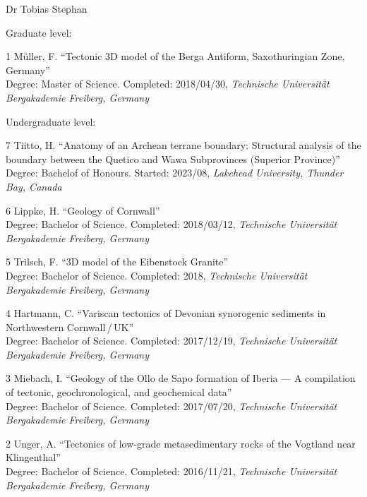 \documentclass[10pt, paper=letter]{scrartcl} %
\begin{document}
\begin{cv}{\textsf{Dr Tobias Stephan}}
\begin{cvlist}{Graduate level:}
        \item[1] Müller, F. \enquote{Tectonic 3D model of the Berga Antiform, Saxothuringian Zone, Germany}\\
        Degree: Master of Science.
        Completed: 2018/04/30, \textit{Technische Universität Bergakademie Freiberg, Germany}
    \end{cvlist}

    \begin{cvlist}{Undergraduate level:}
        \item[7] Tiitto, H. \enquote{Anatomy of an Archean terrane boundary:
            Structural analysis of the boundary between the Quetico and Wawa Subprovinces
            (Superior Province)}\\
        Degree: Bachelof of Honours. Started: 2023/08, \textit{Lakehead University, Thunder
            Bay, Canada}

        \item[6] Lippke, H. \enquote{Geology of Cornwall}\\
        Degree: Bachelor of Science. Completed: 2018/03/12, \textit{Technische Universität Bergakademie Freiberg, Germany}

        \item[5] Trilsch, F. \enquote{3D model of the Eibenstock Granite}\\
        Degree: Bachelor of Science. Completed: 2018, \textit{Technische Universität Bergakademie Freiberg, Germany}

        \item[4] Hartmann, C. \enquote{Variscan tectonics of Devonian synorogenic sediments in Northwestern Cornwall\,/\,UK}\\
        Degree: Bachelor of Science. Completed: 2017/12/19, \textit{Technische Universität Bergakademie Freiberg, Germany}

        \item[3] Miebach, I. \enquote{Geology of the Ollo de Sapo formation of Iberia --- A compilation of tectonic, geochronological, and geochemical data}\\
        Degree: Bachelor of Science. Completed: 2017/07/20, \textit{Technische Universität Bergakademie Freiberg, Germany}

        \item[2] Unger, A. \enquote{Tectonics of low-grade metasedimentary rocks of the Vogtland near Kling\-en\-thal}\\
        Degree: Bachelor of Science. Completed: 2016/11/21, \textit{Technische Universität Bergakademie Freiberg, Germany}


\end{cvlist}
\end{cv}
\end{document}
